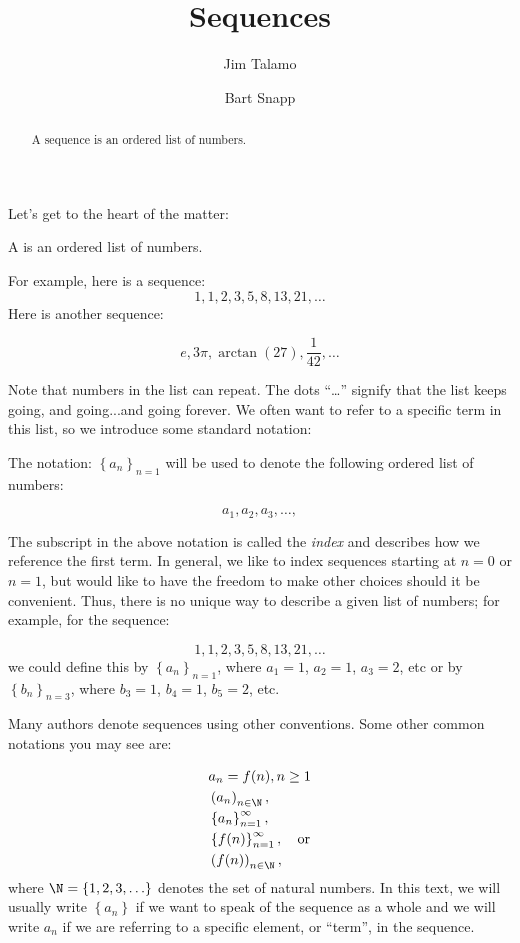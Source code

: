 \documentclass{ximera}
\author{Jim Talamo \and Bart Snapp}
\title[Dig-In:]{Sequences}
\begin{document}
\begin{abstract}
  A sequence is an ordered list of numbers.
\end{abstract}
\maketitle

Let's get to the heart of the matter:

\begin{definition}
  A  is an ordered list of numbers.
\end{definition}

For example, here is a sequence:
\[
1,1, 2, 3, 5, 8, 13, 21, \ldots
\]
Here is another sequence:

\[
e, 3\pi, \arctan(27), \frac{1}{42}, \ldots
\]


Note that numbers in the list can repeat.  The dots ``\ldots'' signify that the list keeps
going, and going...and going forever.  We often want to refer to a specific term in this list, so we introduce some standard notation:
\begin{definition} The notation:  $\left\{a_n\right\}_{n=1}$ will be used to denote the following ordered list of numbers:

\[
a_1, a_2,  a_3, \ldots,
\]
\end{definition}

The subscript in the above notation is called the \emph{index} and describes how we reference the first term.  In general, we like to index sequences starting at $n=0$ or $n=1$, but would like to have the freedom to make other choices should it be convenient.  Thus, there is no unique way to describe a given list of numbers; for example, for the sequence:

\[
1,1, 2, 3, 5, 8, 13, 21, \ldots
\]
we could define this by $\left\{a_n\right\}_{n=1}$, where $a_1=1$, $a_2=1$, $a_3=2$, etc or by  $\left\{b_n\right\}_{n=3}$, where $b_3=1$, $b_4=1$, $b_5=2$, etc.

\begin{remark}
Many authors denote sequences using other conventions.  Some other common notations you may see are: 

\begin{align*}
  &a_n = f(n), n \geq 1   \\
  & \left(a_n\right)_{n \in \N}, \\
  & \left\{a_n\right\}_{n=1}^\infty, \\
  & \left\{f(n)\right\}_{n=1}^\infty, \quad \text{or} \\
  & \left(f(n)\right)_{n \in \N},
\end{align*}
where $\N = \{1,2,3, \ldots \}$ denotes the set of natural  numbers. In this text, we will usually write $\left\{a_n\right\}$ if we want to speak of the sequence as a whole and we will write $a_n$ if we are referring to a specific element, or ``term'', in the sequence.

\end{remark}
\end{document}
